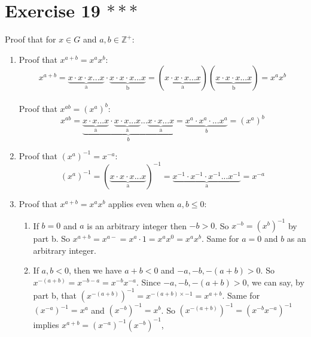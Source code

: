 \documentclass{article}
\newcommand{\Z}{\mathbb{Z}}
\begin{document}
    \section*{Exercise 19 $***$}
    Proof that for $x \in G$ and $a, b \in \Z^{+}:$
    \begin{enumerate}[label=\textbf{\alph*.}]
        \item 
            Proof that $x^{a+b} = x^ax^b$: \\
            \[x^{a+b}
            = \underbrace{x \cdot x \cdot x ... x}_\text{a} \cdot
            \underbrace{x \cdot x \cdot x ... x}_\text{b}
            = (\underbrace{x \cdot x \cdot x ... x}_\text{a})(
                \underbrace{x \cdot x \cdot x ... x}_\text{b})
            = x^ax^b\] \\
            Proof that $x^{ab} = (x^a)^b$: \\
            \[x^{ab}
            = \underbrace{\underbrace{x \cdot x ... x}_\text{a} \cdot
            \underbrace{x \cdot x ... x}_\text{a} ...
            \underbrace{x \cdot x ... x}_\text{a}}_{b}
            = \underbrace{x^a \cdot x^a \cdot ... x^a}_{b}
            = (x^a)^b\]
        \item 
            Proof that $(x^a)^{-1} = x^{-a}$:
            \[(x^a)^{-1} = (\underbrace{x \cdot x \cdot x ... x}_\text{a})^{-1}
            = \underbrace{x^{-1} \cdot x^{-1} \cdot x^{-1} ... x^{-1}}_\text{a}
            = x^{-a}\]
        \item
            Proof that $x^{a+b} = x^ax^b$ applies even when $a, b \leqslant 0$:
            \begin{enumerate}[label=\textbf{case \arabic*:}]
                \item
                    If $b = 0$ and $a$ is an arbitrary integer
                    then $-b > 0$. So $x^{-b} = (x^{b})^{-1}$ by part b.
                    So $x^{a+b} = x^{a-} = x^a \cdot 1 = x^ax^0 = x^ax^b$.
                    Same for $a = 0$ and $b$ as an arbitrary integer.
                \item
                    If $a, b < 0$,
                    then we have $a + b < 0$
                    and $-a, -b, -(a+b) > 0$.
                    So $x^{-(a+b)} = x^{-b - a} = x^{-b}x^{-a}$.
                    Since $-a, -b, -(a+b) > 0$, we can say, by part b,
                    that $(x^{-(a+b)})^{-1} = x^{-(a+b) \times -1} = x^{a+b}$.
                    Same for $(x^{-a})^{-1} = x^a$ and $(x^{-b})^{-1} = x^b$.
                    So $(x^{-(a+b)})^{-1} = (x^{-b}x^{-a})^{-1}$
                    implies $x^{a+b} = (x^{-a})^{-1}(x^{-b})^{-1}$,

\end{enumerate}
\end{enumerate}
\end{document}
